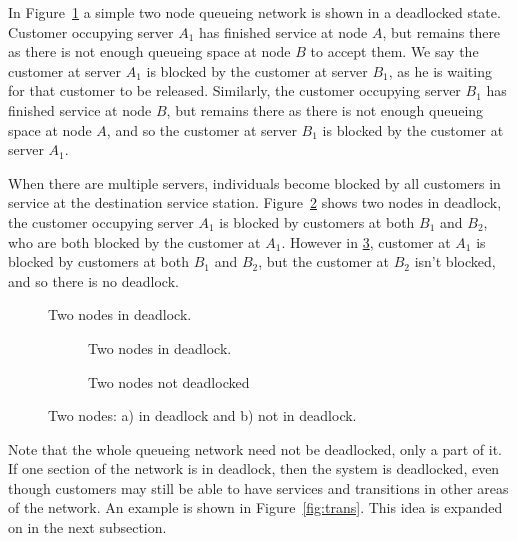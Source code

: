 \documentclass{article}
\begin{document}
In Figure~\ref{fig:2in_deadlock} a simple two node queueing network is shown in a deadlocked state.
Customer occupying server $A_1$ has finished service at node $A$, but remains there as there is not
enough queueing space at node $B$ to accept them.
We say the customer at server $A_1$ is blocked by the customer at server $B_1$, as he is waiting for that customer to be released.
Similarly, the customer occupying server $B_1$ has finished service at node $B$, but remains there as there is not enough queueing space at node $A$, and so the customer at server $B_1$ is blocked by the customer at server $A_1$.

When there are multiple servers, individuals become blocked by all customers in
service at the destination service station.
Figure~\ref{fig:inout_deadlock_in} shows two nodes in deadlock, the customer occupying server $A_1$ is blocked by customers at both $B_1$ and $B_2$, who are both blocked by the customer at $A_1$.
However in \ref{fig:inout_deadlock_out}, customer at $A_1$ is blocked by customers at both $B_1$ and $B_2$, but the customer at $B_2$ isn't blocked, and so there is no deadlock.

\begin{figure}[H]
  \begin{center}
  
  \caption{Two nodes in deadlock.}
  \label{fig:2in_deadlock}
  \end{center}
\end{figure}

\begin{figure}[H]
\begin{subfigure}[b]{0.5\textwidth}
  
  \caption{Two nodes in deadlock.}
  \label{fig:inout_deadlock_in}
\end{subfigure}
\begin{subfigure}[b]{0.5\textwidth}
  
  \caption{Two nodes not deadlocked}
  \label{fig:inout_deadlock_out}
\end{subfigure}
\caption{Two nodes: a) in deadlock and b) not in deadlock.}
\label{fig:inout_deadlock}
\end{figure}

Note that the whole queueing network need not be deadlocked, only a part of it.
If one section of the network is in deadlock, then the system is deadlocked, even though customers may still be able to have services and transitions in other areas of the network.
An example is shown in Figure~\ref{fig:trans}.
This idea is expanded on in the next subsection.
\end{document}
